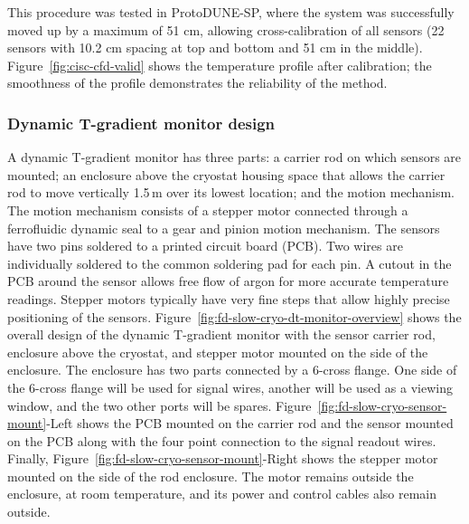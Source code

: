 This procedure was tested in ProtoDUNE-SP, where the system was successfully moved up by a maximum of 51 cm, allowing cross-calibration of all sensors (22 sensors with 10.2 cm spacing at top and bottom and 51 cm in the middle). 
Figure~\ref{fig:cisc-cfd-valid} shows the temperature profile after calibration; the smoothness of the profile demonstrates the reliability of the method.  


\subsubsection{Dynamic T-gradient monitor design}
A dynamic T-gradient monitor has three parts: a carrier rod on which sensors are mounted; an enclosure above the cryostat housing space that allows the carrier rod to move vertically   1.5\,m over its lowest location; and the motion mechanism. The motion mechanism consists of a stepper motor connected through a ferrofluidic dynamic seal to a gear and pinion motion mechanism. The sensors have two pins soldered to a printed circuit board (PCB). Two wires are individually soldered to the common soldering pad for each pin.  A cutout in the PCB around the sensor allows free flow of argon for more accurate temperature readings.  Stepper motors typically have very fine steps that allow highly precise positioning of the sensors.  Figure~\ref{fig:fd-slow-cryo-dt-monitor-overview} shows the overall design of the dynamic T-gradient monitor with the sensor carrier rod, enclosure above the cryostat, and stepper motor mounted on the side of the enclosure. The enclosure has two parts connected by a 6-cross flange. One side of the 6-cross flange will be used for signal wires, another will be used as a viewing window, and the two other ports will be spares. Figure~\ref{fig:fd-slow-cryo-sensor-mount}-Left shows the PCB mounted on the carrier rod and the sensor mounted on the PCB along with the four point connection to the signal readout wires. Finally, Figure~\ref{fig:fd-slow-cryo-sensor-mount}-Right shows the stepper motor mounted on the side of the rod enclosure. The motor remains outside the enclosure, at room temperature, and its power and control cables also remain outside.

